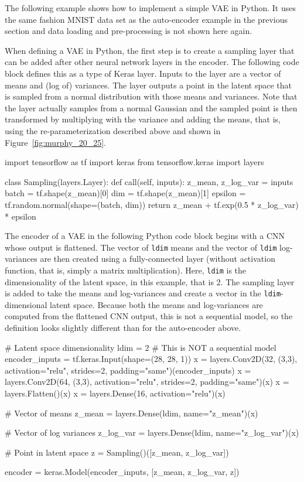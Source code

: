 The following example shows how to implement a simple VAE in Python. It uses the same fashion MNIST data set as the auto-encoder example in the previous section and data loading and pre-processing is not shown here again. 

When defining a VAE in Python, the first step is to create a sampling layer that can be added after other neural network layers in the encoder. The following code block defines this as a type of Keras layer. Inputs to the layer are a vector of means and (log of) variances. The layer outputs a point in the latent space that is sampled from a normal distribution with those means and variances. Note that the layer actually samples from a normal Gaussian and the sampled point is then transformed by multiplying with the variance and adding the means, that is, using the re-parameterization described above and shown in Figure~\ref{fig:murphy_20_25}.

\begin{pythoncode}
import tensorflow as tf
import keras
from tensorflow.keras import layers

class Sampling(layers.Layer):
    def call(self, inputs):
        z_mean, z_log_var = inputs
        batch = tf.shape(z_mean)[0]
        dim = tf.shape(z_mean)[1]
        epsilon = tf.random.normal(shape=(batch, dim))
        return z_mean + tf.exp(0.5 * z_log_var) * epsilon
\end{pythoncode}

The encoder of a VAE in the following Python code block begins with a CNN whose output is flattened. The vector of \texttt{ldim} means and the vector of \texttt{ldim} log-variances are then created using a fully-connected layer (without activation function, that is, simply a matrix multiplication). Here, \texttt{ldim} is the dimensionality of the latent space, in this example, that is 2. The sampling layer is added to take the means and log-variances and create a vector in the \texttt{ldim}-dimensional latent space. Because both the means and log-variances are computed from the flattened CNN output, this is not a sequential model, so the definition looks slightly different than for the auto-encoder above.

\begin{pythoncode}
# Latent space dimensionality
ldim = 2
# This is NOT a sequential model
encoder_inputs = tf.keras.Input(shape=(28, 28, 1))
x = layers.Conv2D(32, (3,3), activation="relu", 
             strides=2, padding="same")(encoder_inputs)
x = layers.Conv2D(64, (3,3), activation="relu", 
             strides=2, padding="same")(x)
x = layers.Flatten()(x)
x = layers.Dense(16, activation="relu")(x)

# Vector of means
z_mean = layers.Dense(ldim, name="z_mean")(x)

# Vector of log variances
z_log_var = layers.Dense(ldim, name="z_log_var")(x)

# Point in latent space
z = Sampling()([z_mean, z_log_var])

encoder = keras.Model(encoder_inputs, [z_mean, z_log_var, z])
\end{pythoncode}

